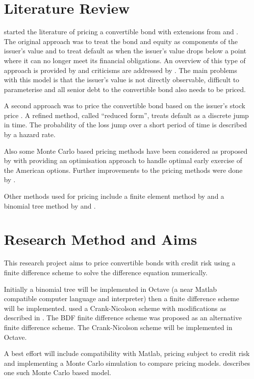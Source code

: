 \documentclass[a4paper,11pt,oneside]{article}
\newcommand{\setlinespacing}[1]
           {\renewcommand{\baselinestretch}{#1}\small\normalsize}
\begin{document}
\section{Literature Review}
\citet{I77} started the literature of pricing a convertible bond with extensions from \citet{BS77} and \citet{BS80}.  The original approach was to treat the bond and equity as components of the issuer's value and to treat default as when the issuer's value drops below a point where it can no longer meet its financial obligations.  An overview of this type of approach is provided by \citet{N96} and criticisms are addressed by \citet{JT95}.  The main problems with this model is that the issuer's value is not directly observable, difficult to parameterise and all senior debt to the convertible bond also needs to be priced.

A second approach was to price the convertible bond based on the issuer's stock price \cite{MS86}.  A refined method, called ``reduced form'', treats default as a discrete jump in time.  The probability of the loss jump over a short period of time is described by a hazard rate.

Also some Monte Carlo based pricing methods have been considered as proposed by \citet{B89} with \citet{G03} providing an optimisation approach to handle optimal early exercise of the American options.  Further improvements to the pricing methods were done by \citet{AKW08}.

Other methods used for pricing include a finite element method by \citet{BBH03} and a binomial tree method by \citet{TKN01} and \citet{AFV02}.

\section{Research Method and Aims}
This research project aims to price convertible bonds with credit risk using a finite difference scheme to solve the difference equation numerically.

Initially a binomial tree will be implemented in Octave (a near Matlab compatible computer language and interpreter) then a finite difference scheme will be implemented.   used a Crank-Nicolson scheme with modifications as described in \citet{R84}.  The BDF finite difference scheme \cite{B98} was proposed as an alternative finite difference scheme.  The Crank-Nicolson scheme will be implemented in Octave.

A best effort will include compatibility with Matlab, pricing subject to credit risk and implementing a Monte Carlo simulation to compare pricing models.  \citet{AKW08} describes one such Monte Carlo based model.


\clearpage
\setlinespacing{1}


\end{document}
